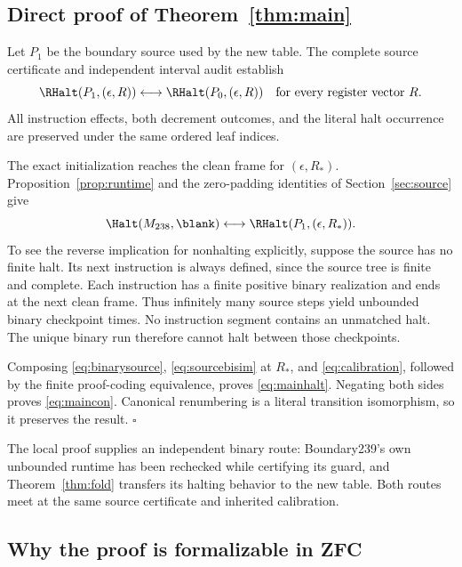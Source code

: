 \subsection{Direct proof of Theorem~\ref{thm:main}}

Let $P_1$ be the boundary source used by the new table.
The complete source certificate and independent interval
audit establish
\begin{equation}
 \RHalt(P_1,(\epsilon,R))
 \longleftrightarrow
 \RHalt(P_0,(\epsilon,R))
 \quad\text{for every register vector }R.
 \label{eq:sourcebisim}
\end{equation}
All instruction effects, both decrement outcomes, and the
literal halt occurrence are preserved under the same ordered
leaf indices.

The exact initialization reaches the clean frame for
$(\epsilon,R_*)$. Proposition~\ref{prop:runtime} and the
zero-padding identities of Section~\ref{sec:source} give
\begin{equation}
 \Halt(M_{238},\blank)
 \longleftrightarrow
 \RHalt(P_1,(\epsilon,R_*)).
 \label{eq:binarysource}
\end{equation}
To see the reverse implication for nonhalting explicitly,
suppose the source has no finite halt. Its next instruction is
always defined, since the source tree is finite and complete.
Each instruction has a finite positive binary realization
and ends at the next clean frame. Thus infinitely many source
steps yield unbounded binary checkpoint times. No instruction
segment contains an unmatched halt. The unique binary run
therefore cannot halt between those checkpoints.

Composing \eqref{eq:binarysource}, \eqref{eq:sourcebisim} at
$R_*$, and \eqref{eq:calibration}, followed by the finite
proof-coding equivalence, proves \eqref{eq:mainhalt}. Negating
both sides proves \eqref{eq:maincon}. Canonical renumbering is
a literal transition isomorphism, so it preserves the result.
\hfill$\square$

The local proof supplies an independent binary route:
Boundary239's own unbounded runtime has been rechecked while
certifying its guard, and Theorem~\ref{thm:fold} transfers its
halting behavior to the new table. Both routes meet at the
same source certificate and inherited calibration.

\subsection{Why the proof is formalizable in ZFC}

